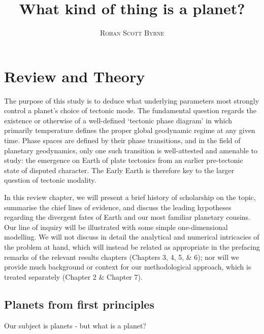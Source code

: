 \documentclass[a4paper,11pt,oneside]{book}
\title{\Huge \textbf{What kind of thing is a planet?}}
\author{\textsc{Rohan Scott Byrne}}
\begin{document}
\sloppy

\frontmatter
\maketitle

\tableofcontents

\mainmatter

% 
% 

\cite{Sarma2008-wu}

\section{Review and Theory}

The purpose of this study is to deduce what underlying parameters most strongly control a planet's choice of tectonic mode. The fundamental question regards the existence or otherwise of a well-defined `tectonic phase diagram' in which primarily temperature defines the proper global geodynamic regime at any given time. Phase spaces are defined by their phase transitions, and in the field of planetary geodynamics, only one such transition is well-attested and amenable to study: the emergence on Earth of plate tectonics from an earlier pre-tectonic state of disputed character. The Early Earth is therefore key to the larger question of tectonic modality.

In this review chapter, we will present a brief history of scholarship on the topic, summarise the chief lines of evidence, and discuss the leading hypotheses regarding the divergent fates of Earth and our most familiar planetary cousins. Our line of inquiry will be illustrated with some simple one-dimensional modelling. We will not discuss in detail the analytical and numerical intricacies of the problem at hand, which will instead be related as appropriate in the prefacing remarks of the relevant results chapters (Chapters 3, 4, 5, \& 6); nor will we provide much background or context for our methodological approach, which is treated separately (Chapter 2 \& Chapter 7).

\subsection{Planets from first principles}

Our subject is planets - but what is a planet?
\end{document}
